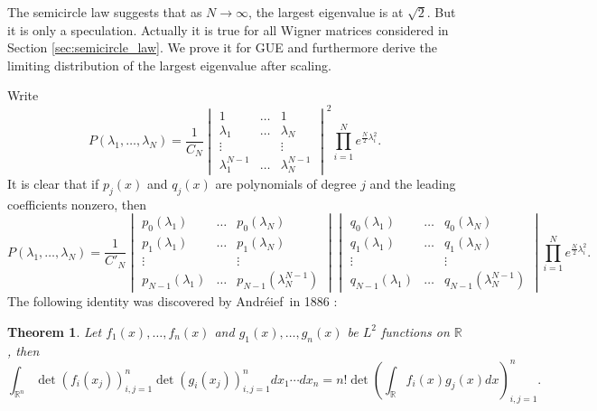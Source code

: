 \documentclass[11pt, a4paper]{article}
\numberwithin{equation}{section}
\newcommand{\realR}{\mathbb{R}}
\newcommand{\Andreief}{Andr\'{e}ief}
\newtheorem{thm}{Theorem}
\theoremstyle{definition}
\theoremstyle{remark}
\begin{document}
The semicircle law suggests that as $N \to \infty$, the largest eigenvalue is at $\sqrt{2}$. But it is only a speculation. Actually it is true for all Wigner matrices considered in Section \ref{sec:semicircle_law}. We prove it for GUE and furthermore derive the limiting distribution of the largest eigenvalue after scaling.

Write
\begin{equation}
  P(\lambda_1, \dotsc, \lambda_N) = \frac{1}{C_N}
  \begin{vmatrix}
    1 & \dots & 1 \\
    \lambda_1 & \dots & \lambda_N \\
    \vdots & & \vdots \\
    \lambda^{N - 1}_1 & \dots & \lambda^{N - 1}_N
  \end{vmatrix}^2
  \prod^N_{i = 1} e^{\frac{N}{2} \lambda^2_i}.
\end{equation}
It is clear that if $p_j(x)$ and $q_j(x)$ are polynomials of degree $j$ and the leading coefficients nonzero, then
\begin{equation}
  P(\lambda_1, \dotsc, \lambda_N) = \frac{1}{C'_N}
  \begin{vmatrix}
    p_0(\lambda_1) & \dots & p_0(\lambda_N) \\
    p_1(\lambda_1) & \dots & p_1(\lambda_N) \\
    \vdots & & \vdots \\
    p_{N - 1}(\lambda_1) & \dots & p_{N - 1}(\lambda^{N - 1}_N)
  \end{vmatrix}
  \begin{vmatrix}
    q_0(\lambda_1) & \dots & q_0(\lambda_N) \\
    q_1(\lambda_1) & \dots & q_1(\lambda_N) \\
    \vdots & & \vdots \\
    q_{N - 1}(\lambda_1) & \dots & q_{N - 1}(\lambda^{N - 1}_N)
  \end{vmatrix}
  \prod^N_{i = 1} e^{\frac{N}{2} \lambda^2_i}.
\end{equation}
The following identity was discovered by \Andreief\ in 1886 \cite{Andreief86}:
\begin{thm}
  Let $f_1(x), \dotsc, f_n(x)$ and $g_1(x), \dotsc, g_n(x)$ be $L^2$ functions on $\realR$, then
  \begin{equation}
    \int_{\realR^n} \det(f_i(x_j))^n_{i, j = 1} \det(g_i(x_j))^n_{i, j = 1} dx_1 \dotsm dx_n = n! \det \left( \int_{\realR} f_i(x) g_j(x) dx \right)^n_{i, j = 1}.
  \end{equation}
\end{thm}
\end{document}
